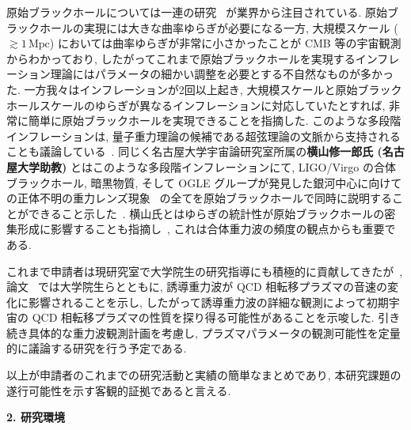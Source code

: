 \documentclass[11pt,a4paper,uplatex,dvipdfmx]{ujarticle} 		%
\newcommand{\研究課題名}{確率解析・原始ブラックホール・重力波観測から迫るインフレーション}
\newcommand{\研究機関名}{名古屋大学}
\newcommand{\研究代表者氏名}{多田祐一郎}
\newcommand{\研究期間の最終元号年度}{6}  %
\renewcommand{\emph}[1]{{\sffamily\gtfamily\bfseries #1}}
\begin{document}
原始ブラックホールについては一連の研究~\cite{Kawasaki:2016pql,Inomata:2016rbd,Inomata:2017okj,Inomata:2017uaw} が業界から注目されている.
原始ブラックホールの実現には大きな曲率ゆらぎが必要になる一方, 大規模スケール ($\gtrsim1\,\mathrm{Mpc}$) においては曲率ゆらぎが非常に小さかったことが CMB 等の宇宙観測からわかっており,
したがってこれまで原始ブラックホールを実現するインフレーション理論にはパラメータの細かい調整を必要とする不自然なものが多かった.
一方我々はインフレーションが2回以上起き, 大規模スケールと原始ブラックホールスケールのゆらぎが異なるインフレーションに対応していたとすれば, 非常に簡単に原始ブラックホールを実現できることを指摘した.
このような多段階インフレーションは, 量子重力理論の候補である超弦理論の文脈から支持されることも議論している~\cite{Kogai:2020jkq}.
同じく名古屋大学宇宙論研究室所属の\emph{横山修一郎氏 (名古屋大学助教)} とはこのような多段階インフレーションにて, LIGO/Virgo の合体ブラックホール, 暗黒物質, そして OGLE グループが発見した銀河中心に向けての正体不明の重力レンズ現象~\cite{Niikura:2019kqi}
の全てを原始ブラックホールで同時に説明することができること示した~\cite{Tada:2019amh}.
横山氏とはゆらぎの統計性が原始ブラックホールの密集形成に影響することも指摘し~\cite{Tada:2015noa}, これは合体重力波の頻度の観点からも重要である.

これまで申請者は現研究室で大学院生の研究指導にも積極的に貢献してきたが~\cite{Kogai:2020jkq,Mikura:2020qhc,Abe:2020sqb},
論文~\cite{Abe:2020sqb} では大学院生らとともに, 誘導重力波が QCD 相転移プラズマの音速の変化に影響されることを示し, 
したがって誘導重力波の詳細な観測によって初期宇宙の QCD 相転移プラズマの性質を探り得る可能性があることを示唆した.
引き続き具体的な重力波観測計画を考慮し, プラズマパラメータの観測可能性を定量的に議論する研究を行う予定である.

以上が申請者のこれまでの研究活動と実績の簡単なまとめであり, 本研究課題の遂行可能性を示す客観的証拠であると言える.


\begin{mdframed}[roundcorner=0.5zw,
	innertopmargin=0.8zw,innerbottommargin=0.8zw,
	linecolor=black!50,linewidth=0.2zw,
	backgroundcolor=black!10]
	{\bfseries\gtfamily\sffamily\large 2. 研究環境}
\end{mdframed}
\end{document}
